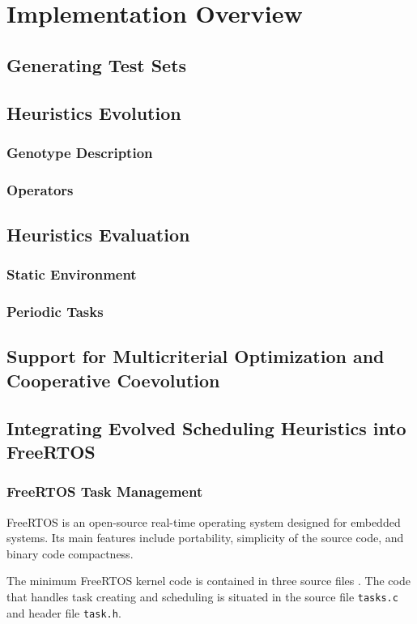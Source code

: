 \chapter{Implementation Overview}
\section{Generating Test Sets}
\section{Heuristics Evolution}
\subsection{Genotype Description}
\subsection{Operators}
\section{Heuristics Evaluation}
\subsection{Static Environment}
\subsection{Periodic Tasks}
\section{Support for Multicriterial Optimization and Cooperative Coevolution}
\section{Integrating Evolved Scheduling Heuristics into FreeRTOS}
\subsection{FreeRTOS Task Management}
FreeRTOS is an open-source real-time operating system designed for embedded systems. 
Its main features include portability, simplicity of the source code, and binary code compactness. 

The minimum FreeRTOS kernel code is contained in three source files \cite{brown2012architecture}. 
The code that handles task creating and scheduling is situated in the source file \verb$tasks.c$ and header file \verb$task.h$.

